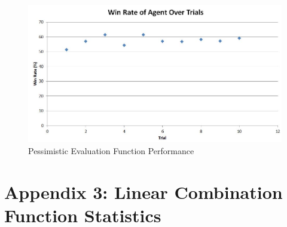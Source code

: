 \documentclass[12pt]{article}
\begin{document}
\begin{figure}[htbp]
\centering
\caption{Pessimistic Evaluation Function Performance}
\includegraphics[scale=0.7]{pessimistic-evaluation-function-results.JPG}
\end{figure}

\clearpage
\section{Appendix 3: Linear Combination Function Statistics}
\end{document}
